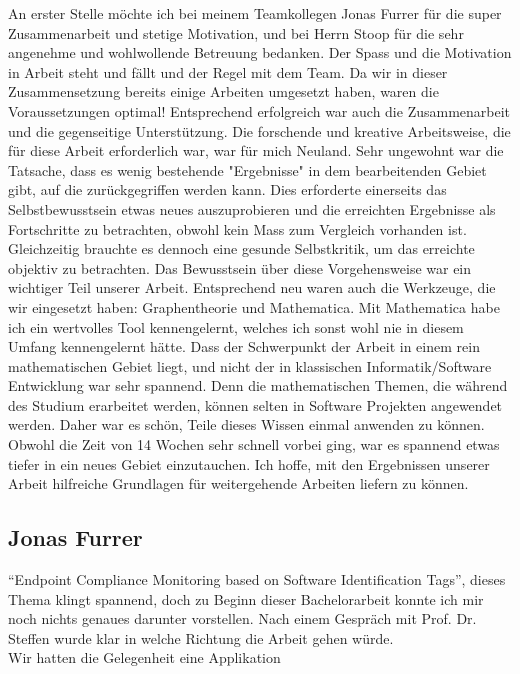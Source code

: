 An erster Stelle möchte ich bei meinem Teamkollegen Jonas Furrer für die super
Zusammenarbeit und stetige Motivation, und bei Herrn Stoop für die sehr
angenehme und wohlwollende Betreuung bedanken. Der Spass und die Motivation in
Arbeit steht und fällt und der Regel mit dem Team. Da wir in dieser
Zusammensetzung bereits einige Arbeiten umgesetzt haben, waren die
Voraussetzungen optimal! Entsprechend erfolgreich war auch die Zusammenarbeit
und die gegenseitige Unterstützung. Die forschende und kreative Arbeitsweise,
die für diese Arbeit erforderlich war, war für mich Neuland. Sehr ungewohnt war
die Tatsache, dass es wenig bestehende "Ergebnisse" in dem bearbeitenden Gebiet
gibt, auf die zurückgegriffen werden kann.  Dies erforderte einerseits das
Selbstbewusstsein etwas neues auszuprobieren und die erreichten Ergebnisse als
Fortschritte zu betrachten, obwohl kein Mass zum Vergleich vorhanden ist.
Gleichzeitig  brauchte es dennoch eine gesunde Selbstkritik, um das erreichte
objektiv zu betrachten. Das Bewusstsein über diese Vorgehensweise war ein
wichtiger Teil unserer Arbeit. Entsprechend neu waren auch die Werkzeuge, die
wir eingesetzt haben: Graphentheorie und Mathematica. Mit Mathematica habe ich
ein wertvolles Tool kennengelernt, welches ich sonst wohl nie in diesem Umfang
kennengelernt hätte. Dass der Schwerpunkt der Arbeit in einem rein
mathematischen Gebiet liegt, und nicht der in klassischen Informatik/Software
Entwicklung war sehr spannend. Denn die mathematischen Themen, die während des
Studium erarbeitet werden, können selten in Software Projekten angewendet
werden. Daher war es schön, Teile dieses Wissen einmal anwenden zu können.
Obwohl die Zeit von 14 Wochen sehr schnell vorbei ging, war es spannend etwas
tiefer in ein neues Gebiet einzutauchen. Ich hoffe, mit den Ergebnissen unserer
Arbeit hilfreiche Grundlagen für weitergehende Arbeiten liefern zu können.


\subsection{Jonas Furrer} 



\enquote{Endpoint Compliance Monitoring based on Software Identification Tags}, dieses Thema klingt spannend, doch zu Beginn dieser Bachelorarbeit konnte ich mir noch nichts genaues darunter vorstellen. Nach einem Gespräch mit Prof. Dr. Steffen wurde klar in welche Richtung die Arbeit gehen würde.\\
Wir hatten die Gelegenheit eine Applikation 

